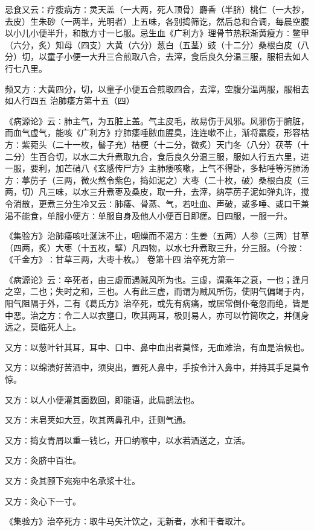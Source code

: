 \documentclass[a4paper,12pt,UTF8,twoside]{ctexbook}
\begin{document}
忌食又云∶疗瘦病方∶灵天盖（一大两，死人顶骨）麝香（半脐）桃仁（一大抄，去皮）生朱砂（一两半，光明者）上五味，各别捣筛讫，然后总和合调，每晨空腹以小儿小便半升，和散方寸一匕服。忌生血《广利方》理骨节热积渐黄瘦方∶鳖甲（六分，炙）知母（四支）大黄（六分）葱白（五茎）豉（十二分）桑根白皮（八分）切，以童子小便一大升三合煎取八合，去滓，食后良久分温三服，服相去如人行七八里。

频又方∶大黄四分，切，以童子小便五合煎取四合，去滓，空腹分温两服，服相去如人行四五
治肺痿方第十五（四）

《病源论》云∶肺主气，为五脏上盖。气主皮毛，故易伤于风邪。风邪伤于腑脏，而血气虚气，能咳《广利方》疗肺痿唾脓血腥臭，连连嗽不止，渐将羸瘦，形容枯方∶紫菀头（二十一枚，髻子充）桔梗（十二分，微炙）天门冬（八分）茯苓（十二分）生百合切，以水二大升煮取九合，食后良久分温三服，服如人行五六里，进一服，要利，加芒硝八《玄感传尸方》主肺痿咳嗽，上气不得卧，多粘唾等泻肺汤方∶葶苈子（三两，微火熬令紫色，捣如泥之）大枣（二十枚，破）桑根白皮（三两，切）凡三味，以水三升煮枣及桑皮，取一升，去滓，纳葶苈子泥如弹丸许，搅令消散，更煮三分生冷又云∶肺痿、骨蒸、气，若吐血、声破，或多唾、或口干兼渴不能食，单服小便方∶单服自身及他人小便百日即瘥。日四服，一服一升。

《集验方》治肺痿咳吐涎沫不止，咽燥而不渴方∶生姜（五两）人参（三两）甘草（四两，炙）大枣（十五枚，擘）凡四物，以水七升煮取三升，分三服。（今按∶《千金方》∶甘草三两，大枣十枚。）
卷第十四
治卒死方第一

《病源论》云∶卒死者，由三虚而遇贼风所为也。三虚，谓乘年之衰，一也；逢月之空，二也；失时之和，三也。人有此三虚，而谓为贼风所伤，使阴气偏竭于内，阳气阻隔于外，二有《葛氏方》治卒死，或先有病痛，或居常倒仆奄忽而绝，皆是中恶。治之方∶令二人以衣壅口，吹其两耳，极则易人，亦可以竹筒吹之，并侧身远之，莫临死人上。

又方∶以葱叶针其耳，耳中、口中、鼻中血出者莫怪，无血难治，有血是治候也。

又方∶以绵渍好苦酒中，须臾出，置死人鼻中，手按令汁入鼻中，并持其手足莫令惊。

又方∶以人小便灌其面数回，即能语，此扁鹊法也。

又方∶末皂荚如大豆，吹其两鼻孔中，迁则气通。

又方∶捣女青屑以重一钱匕，开口纳喉中，以水若酒送之，立活。

又方∶灸脐中百壮。

又方∶灸其颐下宛宛中名承浆十壮。

又方∶灸心下一寸。

《集验方》治卒死方∶取牛马矢汁饮之，无新者，水和干者取汁。
\end{document}
